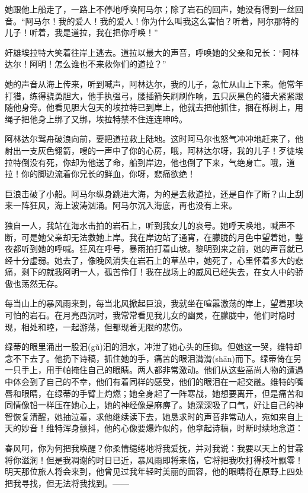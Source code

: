 \documentclass[12pt,oneside]{book}
\begin{document}
她跟他上船走了，一路上不停地呼唤阿马尔；除了岩石的回声，她没有得到一丝回音。“阿马尔！我的爱人！我的爱人！你为什么叫我这么害怕？听着，阿尔那特的儿子！听着，我是道拉，我在把你呼唤！”

奸雄埃拉特大笑着往岸上逃去。道拉以最大的声音，呼唤她的父亲和兄长：“阿林达尔！阿明！怎么谁也不来救你们的道拉？”

她的声音从海上传来，听到喊声，阿林达尔，我的儿子，急忙从山上下来。他常年打猎，练得骁勇胆大，他手执强弓，腰插箭矢刷刷作响，五只灰黑色的猎犬紧紧跟随他身旁。他看见胆大包天的埃拉特已到岸上，他就去把他抓住，捆在栎树上，用绳子把他身上绑了又绑，埃拉特禁不住连连呻吟。

阿林达尔驾舟破浪向前，要把道拉救上陆地。这时阿马尔也怒气冲冲地赶来了，他射出一支灰色翎箭，嗖的一声中了你的心房，哦，阿林达尔呀，我的儿子！歹徒埃拉特倒没有死，你却为他送了命，船到岸边，他也倒了下来，气绝身亡。哦，道拉！你的脚边流着你兄长的鲜血，你呀，悲痛欲绝！

巨浪击破了小船。阿马尔纵身跳进大海，为的是去救道拉，还是自作了断？山上刮来一阵狂风，海上波涛汹涌。阿马尔沉入海底，再也没有上来。

独自一人，我站在海水击拍的岩石上，听到我女儿的哀号。她呼天唤地，喊声不断，可是她父亲却无法救她上岸。我在岸边站了通宵，在朦胧的月色中望着她，整夜都听到她的呼喊。狂风在呼号，暴雨拍打着山坡。黎明到来之前，她的声音就已经十分虚弱。她去了，像晚风消失在岩石上的草丛中，她死了，心里怀着多大的悲痛，剩下的就我阿明一人，孤苦伶仃！我在战场上的威风已经失去，在女人中的骄傲也荡然无存。

每当山上的暴风雨来到，每当北风掀起巨浪，我就坐在喧嚣激荡的岸上，望着那块可怕的岩石。在月亮西沉时，我常常看见我儿女的幽灵，在朦胧中，他们时隐时现，相处和睦，一起游荡，但都现着无限的悲伤。

\begin{framed}
绿蒂的眼里涌出一股汩(gǔ)汩的泪水，冲泄了她心头的压抑。但她这一哭，维特却念不下去了。他扔下诗稿，抓住她的手，痛苦的眼泪潸潸(shān)而下。绿蒂倚在另一只手上，用手帕掩住自己的眼睛。两人都非常激动。他们从这些高尚人物的遭遇中体会到了自己的不幸，他们有着同样的感受，他们的眼泪在一起交融。维特的嘴唇和眼睛，在绿蒂的手臂上灼燃；她全身起了一阵寒战，她想要离开，但是痛苦和同情像铅一样压在她心上，她的神经像是麻痹了。她深深吸了口气，好让自己的神智恢复清醒，她抽泣着，求他继续读下去，她恳求时的声音非常动人，宛如来自上天的妙音！维特浑身颤抖，他的心像要爆炸似的，他拿起诗稿，时断时续地念道：
\end{framed}

春风呵，你为何把我唤醒？你柔情缱绻地将我爱抚，并对我说：我要以天上的甘霖将你滋润！但是我凋谢的时日已近，暴风雨即将来临，它将把我吹打得枝叶飘零！明天那位旅人将会来到，他曾见过我年轻时美丽的面容，他的眼睛将在原野上四处把我寻找，但无法将我找到。——
\end{document}
